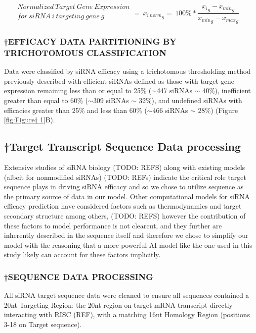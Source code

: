 \documentclass{report}
\begin{document}
\begin{equation}\label{eq:normalize}
\begin{matrix}Normalized\ Target\ Gene\ Expression\\for\ siRNA\ i\ targeting\ gene\ g\\\end{matrix}=\ {x_{i\ norm}}_g=\ 100\%\ast\frac{{x_i}_g-{x_{min}}_g}{{x_{min}}_g-{x_{max}}_g}\ \  
\end{equation}

\subsubsection{†EFFICACY DATA PARTITIONING BY TRICHOTOMOUS CLASSIFICATION}
Data were classified by siRNA efficacy using a trichotomous thresholding method previously described \cite{monopoli_asymmetric_2023} with efficient siRNAs defined as those with target gene expression remaining less than or equal to 25\% ($\sim$447 siRNAs $\sim$ 40\%), inefficient greater than equal to 60\% ($\sim$309 siRNAs $\sim$ 32\%), and undefined siRNAs with efficacies greater than 25\% and less than 60\% ($\sim$466 siRNAs $\sim$ 28\%) (Figure \ref{fig:Figure† 1}B).


\subsection{†Target Transcript Sequence Data processing}
Extensive studies of siRNA biology (TODO: REFS) along with existing models (albeit for nonmodified siRNAs) (TODO: REFs) indicate the critical role target sequence plays in driving siRNA efficacy and so we chose to utilize sequence as the primary source of data in our model. Other computational models for siRNA efficacy prediction have considered factors such as thermodynamics and target secondary structure among others, (TODO: REFS) however the contribution of these factors to model performance is not clearcut, and they further are inherently described in the sequence itself and therefore we chose to simplify our model with the reasoning that a more powerful AI model like the one used in this study likely can account for these factors implicitly. 

\subsubsection{†SEQUENCE DATA PROCESSING}
All siRNA target sequence data were cleaned to ensure all sequences contained a 20nt Targeting Region: the 20nt region on target mRNA transcript directly interacting with RISC (REF), with a matching 16nt Homology Region (positions 3-18 on Target sequence). 
\end{document}
